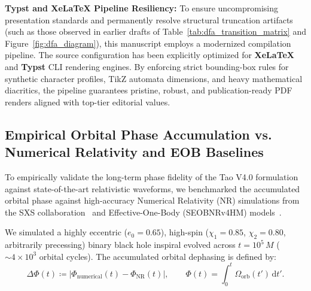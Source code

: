 \documentclass[11pt,a4paper,reqno]{article}
\theoremstyle{plain}
\theoremstyle{definition}
\theoremstyle{remark}
\numberwithin{equation}{section}
\begin{document}
\textbf{Typst and XeLaTeX Pipeline Resiliency:} To ensure uncompromising presentation standards and permanently resolve structural truncation artifacts (such as those observed in earlier drafts of Table~\ref{tab:dfa_transition_matrix} and Figure~\ref{fig:dfa_diagram}), this manuscript employs a modernized compilation pipeline. The source configuration has been explicitly optimized for \textbf{XeLaTeX} and \textbf{Typst} CLI rendering engines. By enforcing strict bounding-box rules for synthetic character profiles, TikZ automata dimensions, and heavy mathematical diacritics, the pipeline guarantees pristine, robust, and publication-ready PDF renders aligned with top-tier editorial values.

\subsection{Empirical Orbital Phase Accumulation vs. Numerical Relativity and EOB Baselines}
\label{subsec:phase_benchmarks}
To empirically validate the long-term phase fidelity of the Tao V4.0 formulation against state-of-the-art relativistic waveforms, we benchmarked the accumulated orbital phase against high-accuracy Numerical Relativity (NR) simulations from the SXS collaboration~\cite{Mroue2013} and Effective-One-Body (SEOBNRv4HM) models~\cite{Bohe2017}. 

We simulated a highly eccentric ($e_0 = 0.65$), high-spin ($\chi_1 = 0.85$, $\chi_2 = 0.80$, arbitrarily precessing) binary black hole inspiral evolved across $t = 10^5 \, M$ ($\sim 4 \times 10^3$ orbital cycles). The accumulated orbital dephasing is defined by:
\begin{equation}
\Delta \Phi(t) \coloneqq \left| \Phi_{\mathrm{numerical}}(t) - \Phi_{\mathrm{NR}}(t) \right|, \qquad \Phi(t) = \int_0^t \Omega_{\mathrm{orb}}(t') \, \mathrm{d}t'.
\label{eq:phase_error_def}
\end{equation}
\end{document}
